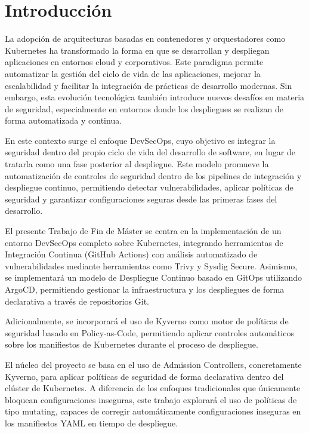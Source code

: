 \chapter{Introducción}

La adopción de arquitecturas basadas en contenedores y orquestadores como Kubernetes ha transformado la forma en que se desarrollan y despliegan aplicaciones en entornos cloud y corporativos. Este paradigma permite automatizar la gestión del ciclo de vida de las aplicaciones, mejorar la escalabilidad y facilitar la integración de prácticas de desarrollo modernas. Sin embargo, esta evolución tecnológica también introduce nuevos desafíos en materia de seguridad, especialmente en entornos donde los despliegues se realizan de forma automatizada y continua.

En este contexto surge el enfoque DevSecOps, cuyo objetivo es integrar la seguridad dentro del propio ciclo de vida del desarrollo de software, en lugar de tratarla como una fase posterior al despliegue. Este modelo promueve la automatización de controles de seguridad dentro de los pipelines de integración y despliegue continuo, permitiendo detectar vulnerabilidades, aplicar políticas de seguridad y garantizar configuraciones seguras desde las primeras fases del desarrollo.

El presente Trabajo de Fin de Máster se centra en la implementación de un entorno DevSecOps completo sobre Kubernetes, integrando herramientas de Integración Continua (GitHub Actions) con análisis automatizado de vulnerabilidades mediante herramientas como Trivy y Sysdig Secure. Asimismo, se implementará un modelo de Despliegue Continuo basado en GitOps utilizando ArgoCD, permitiendo gestionar la infraestructura y los despliegues de forma declarativa a través de repositorios Git.

Adicionalmente, se incorporará el uso de Kyverno como motor de políticas de seguridad basado en Policy-as-Code, permitiendo aplicar controles automáticos sobre los manifiestos de Kubernetes durante el proceso de despliegue.

El núcleo del proyecto se basa en el uso de Admission Controllers, concretamente Kyverno, para aplicar políticas de seguridad de forma declarativa dentro del clúster de Kubernetes. A diferencia de los enfoques tradicionales que únicamente bloquean configuraciones inseguras, este trabajo explorará el uso de políticas de tipo mutating, capaces de corregir automáticamente configuraciones inseguras en los manifiestos YAML en tiempo de despliegue.

